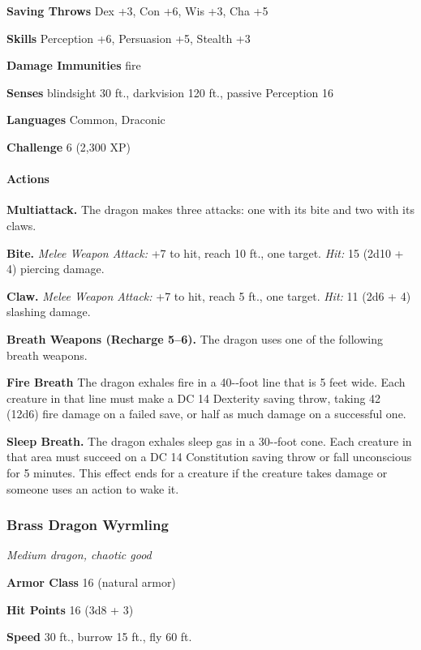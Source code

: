 \documentclass[
]{article}
\begin{document}
\textbf{Saving Throws} Dex +3, Con +6, Wis +3, Cha +5

\textbf{Skills} Perception +6, Persuasion +5, Stealth +3

\textbf{Damage Immunities} fire

\textbf{Senses} blindsight 30 ft., darkvision 120 ft., passive
Perception 16

\textbf{Languages} Common, Draconic

\textbf{Challenge} 6 (2,300 XP)

\hypertarget{actions-45}{%
\paragraph{Actions}\label{actions-45}}

\textbf{Multiattack.} The dragon makes three attacks: one with its bite
and two with its claws.

\textbf{Bite.} \emph{Melee Weapon Attack:} +7 to hit, reach 10 ft., one
target. \emph{Hit:} 15 (2d10 + 4) piercing damage.

\textbf{Claw.} \emph{Melee Weapon Attack:} +7 to hit, reach 5 ft., one
target. \emph{Hit:} 11 (2d6 + 4) slashing damage.

\textbf{Breath Weapons (Recharge 5--6).} The dragon uses one of the
following breath weapons.

\textbf{Fire Breath} The dragon exhales fire in a 40-­‐foot line that is
5 feet wide. Each creature in that line must make a DC 14 Dexterity
saving throw, taking 42 (12d6) fire damage on a failed save, or half as
much damage on a successful one.

\textbf{Sleep Breath.} The dragon exhales sleep gas in a 30-­‐foot cone.
Each creature in that area must succeed on a DC 14 Constitution saving
throw or fall unconscious for 5 minutes. This effect ends for a creature
if the creature takes damage or someone uses an action to wake it.

\hypertarget{brass-dragon-wyrmling}{%
\subsubsection{Brass Dragon Wyrmling}\label{brass-dragon-wyrmling}}

\emph{Medium dragon, chaotic good}

\textbf{Armor Class} 16 (natural armor)

\textbf{Hit Points} 16 (3d8 + 3)

\textbf{Speed} 30 ft., burrow 15 ft., fly 60 ft.
\end{document}
